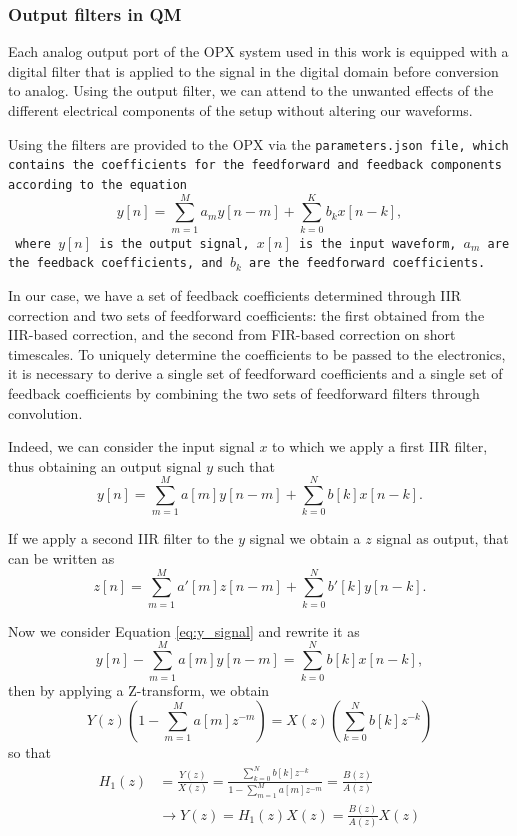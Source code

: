 \subsubsection{Output filters in QM}

Each analog output port of the OPX system used in this work is equipped with a digital filter that is applied to the signal in the digital domain before conversion to analog. 
Using the output filter, we can attend to the unwanted effects of the different electrical components of the setup without altering our waveforms.

Using \Qibolab the filters are provided to the OPX via the \tt{parameters.json} file, which contains the coefficients for the feedforward and feedback components according to the equation
\begin{equation}\label{eq:OPX_filter}
    y[n] = \sum_{m=1}^{M} a_m y[n - m] + \sum_{k=0}^{K} b_k x[n - k],
\end{equation}
where $y[n]$ is the output signal, $x[n]$ is the input waveform, $a_m$ are the feedback coefficients, and $b_k$ are the feedforward coefficients.

In our case, we have a set of feedback coefficients determined through IIR correction and two sets of feedforward coefficients: the first obtained from the IIR-based correction, and the second from FIR-based correction on short timescales. 
To uniquely determine the coefficients to be passed to the electronics, it is necessary to derive a single set of feedforward coefficients and a single set of feedback coefficients by combining the two sets of feedforward filters through convolution.

Indeed, we can consider the input signal $x$ to which we apply a first IIR filter, thus obtaining an output signal $y$ such that 
\begin{equation}\label{eq:y_signal}
    y[n] = \sum_{m=1}^{M} a[m]y[n-m] + \sum_{k=0}^{N} b[k] x[n-k].
\end{equation}

If we apply a second IIR filter to the $y$ signal we obtain a $z$ signal as output, that can be written as 
\begin{equation}\label{eq:z_signal}
    z[n] = \sum_{m=1}^{M} a'[m]z[n-m] + \sum_{k=0}^{N} b'[k] y[n-k].
\end{equation}

Now we consider Equation \ref{eq:y_signal} and rewrite it as
\begin{equation}\label{eq:y_signal1}
    y[n] - \sum_{m=1}^{M} a[m]y[n-m] = \sum_{k=0}^{N} b[k] x[n-k],
\end{equation} 
then by applying a Z-transform, we obtain
\begin{equation}\label{eq:y_signal_transform}
    Y(z)\left(1 - \sum_{m=1}^{M} a[m] z^{-m} \right) = X(z) \left( \sum_{k=0}^{N} b[k] z^{-k} \right)
\end{equation}
so that 
\begin{align}
    H_1(z) &= \frac{Y(z)}{X(z)} = \frac{\sum_{k=0}^{N} b[k] z^{-k}}{1 - \sum_{m=1}^{M} a[m] z^{-m}} = \frac{B(z)}{A(z)} \\
    & \rightarrow Y(z) = H_1(z)X(z) = \frac{B(z)}{A(z)}X(z) \label{eq:transfer1}
\end{align}

